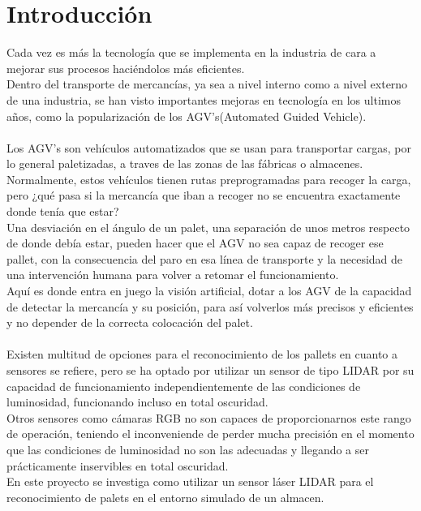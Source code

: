 
\section{Introducción}
Cada vez es más la tecnología que se implementa en la industria de cara a mejorar sus procesos haciéndolos más eficientes. \\Dentro del transporte de mercancías, ya sea a nivel interno como a nivel externo de una industria, se han visto importantes mejoras en tecnología en los ultimos años, como la popularización de los AGV's(Automated Guided Vehicle). \\ \\
Los AGV's son vehículos automatizados que se usan para transportar cargas, por lo general paletizadas,  a traves de las zonas de las fábricas o almacenes.
Normalmente, estos vehículos tienen rutas preprogramadas para recoger la carga, pero ¿qué pasa si la mercancía que iban a recoger no se encuentra exactamente donde tenía que estar? \\
Una desviación en el ángulo de un palet, una separación de unos metros respecto de donde debía estar, pueden hacer que el AGV no sea capaz de recoger ese pallet, con la consecuencia del paro en esa línea de transporte y la necesidad de una intervención humana para volver a retomar el funcionamiento.\\
Aquí es donde entra en juego la visión artificial, dotar a los AGV de la capacidad de detectar la mercancía y su posición, para así volverlos más precisos y eficientes y no depender de la correcta colocación del palet. \\ \\
Existen multitud de opciones para el reconocimiento de los pallets en cuanto a sensores se refiere, pero se ha optado por utilizar un sensor de tipo LIDAR por su capacidad de funcionamiento independientemente de las condiciones de luminosidad, funcionando incluso en total oscuridad.\\ Otros sensores como cámaras RGB no son capaces de proporcionarnos este rango de operación, teniendo el inconveniende de perder mucha precisión en el momento que las condiciones de luminosidad no son las adecuadas y llegando a ser prácticamente inservibles en total oscuridad.\\
En este proyecto se investiga como utilizar un sensor láser LIDAR para el reconocimiento de palets en el entorno simulado de un almacen.\\


